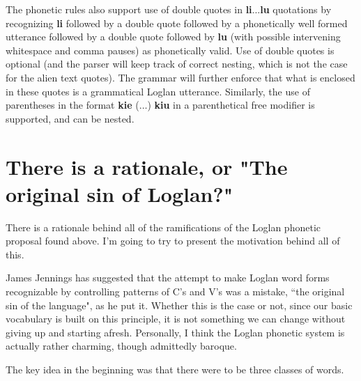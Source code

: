 \documentclass[12pt]{book}
\begin{document}
The phonetic rules also support use of double quotes in {\bf li}...{\bf lu} quotations by recognizing {\bf li} followed by a double quote followed by a phonetically well formed utterance followed by a double quote followed by {\bf lu} (with possible intervening whitespace and comma pauses) as phonetically valid.  Use of double quotes is optional (and the parser will keep track of correct nesting, which is not the case for the alien text quotes).   The grammar will further enforce that what is enclosed in these quotes is a grammatical Loglan utterance.  Similarly, the use of parentheses in the format
{\bf kie} ($\ldots$) {\bf kiu} in a parenthetical free modifier is supported, and can be nested.

\section{There is a rationale, or "The original sin of Loglan?"}

There is a rationale behind all of the ramifications of the Loglan phonetic proposal found above.  I'm going to try to present the motivation behind all of this.

James Jennings has suggested that the attempt to make Loglan word forms recognizable by controlling patterns of C's and V's was a mistake, ``the original sin of the language", as he put it.  Whether this is the case or not, since our basic vocabulary is built on this principle, it is not something we can change without giving up and starting afresh.  Personally, I think the Loglan phonetic system is actually rather charming, though admittedly baroque.

The key idea in the beginning was that there were to be three classes of words.
\end{document}
